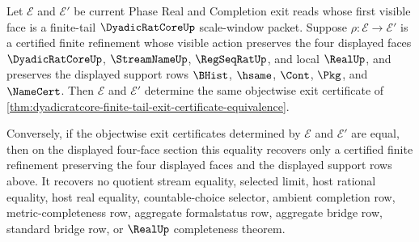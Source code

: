\begin{theorem}
\label{thm:dyadicratcore-finite-tail-exit-certificate-refinement-invariance}
Let $\mathcal E$ and $\mathcal E'$ be current Phase Real and Completion exit reads whose first visible face is a finite-tail $\DyadicRatCoreUp$ scale-window packet. Suppose $\rho : \mathcal E \to \mathcal E'$ is a certified finite refinement whose visible action preserves the four displayed faces $\DyadicRatCoreUp$, $\StreamNameUp$, $\RegSeqRatUp$, and local $\RealUp$, and preserves the displayed support rows $\BHist$, $\hsame$, $\Cont$, $\Pkg$, and $\NameCert$. Then $\mathcal E$ and $\mathcal E'$ determine the same objectwise exit certificate of \autoref{thm:dyadicratcore-finite-tail-exit-certificate-equivalence}.

Conversely, if the objectwise exit certificates determined by $\mathcal E$ and $\mathcal E'$ are equal, then on the displayed four-face section this equality recovers only a certified finite refinement preserving the four displayed faces and the displayed support rows above. It recovers no quotient stream equality, selected limit, host rational equality, host real equality, countable-choice selector, ambient completion row, metric-completeness row, aggregate formalstatus row, aggregate bridge row, standard bridge row, or $\RealUp$ completeness theorem.
\end{theorem}
